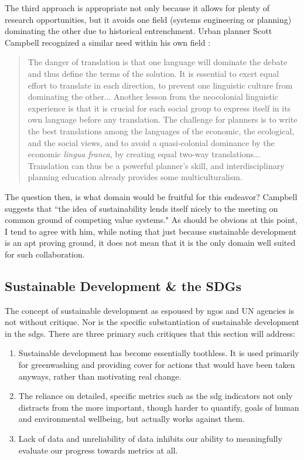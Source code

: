 The third approach is appropriate not only because it allows for plenty of research opportunities, but it avoids one field (systems engineering or planning) dominating the other due to historical entrenchment. Urban planner Scott Campbell recognized a similar need within his own field \cite{campbellGreenCitiesGrowing2016}:

\blockquote{The danger of translation is that one language will dominate the debate and thus define the terms of the solution. It is essential to exert equal effort to translate in each direction, to prevent one linguistic culture from dominating the other... Another lesson from the neocolonial linguistic experience is that it is crucial for each social group to express itself in its own language before any translation. The challenge for planners is to write the best translations among the languages of the economic, the ecological, and the social views, and to avoid a quasi-colonial dominance by the economic \textit{lingua franca}, by creating equal two-way translations... Translation can thus be a powerful planner's skill, and interdisciplinary planning education already provides some multiculturalism.}

The question then, is what domain would be fruitful for this endeavor? Campbell suggests that ``the idea of sustainability lends itself nicely to the meeting on common ground of competing value systems." As should be obvious at this point, I tend to agree with him, while noting that just because sustainable development is an apt proving ground, it does not mean that it is the only domain well suited for such collaboration.

\subsection{Sustainable Development \& the SDGs} \label{sec:sdg_critique}

The concept of sustainable development as espoused by \acp{ngo} and UN agencies is not without critique. Nor is the specific substantiation of sustainable development in the \acp{sdg}. There are three primary such critiques that this section will address:

\begin{enumerate} \setlength{\itemsep}{0pt} \setlength{\parskip}{0pt}
	\item Sustainable development has become essentially toothless. It is used primarily for greenwashing and providing cover for actions that would have been taken anyways, rather than motivating real change.
	\item The reliance on detailed, specific metrics such as the \ac{sdg} indicators not only distracts from the more important, though harder to quantify, goals of human and environmental wellbeing, but actually works against them. 
	\item Lack of data and unreliability of data inhibits our ability to meaningfully evaluate our progress towards metrics at all.
\end{enumerate}

